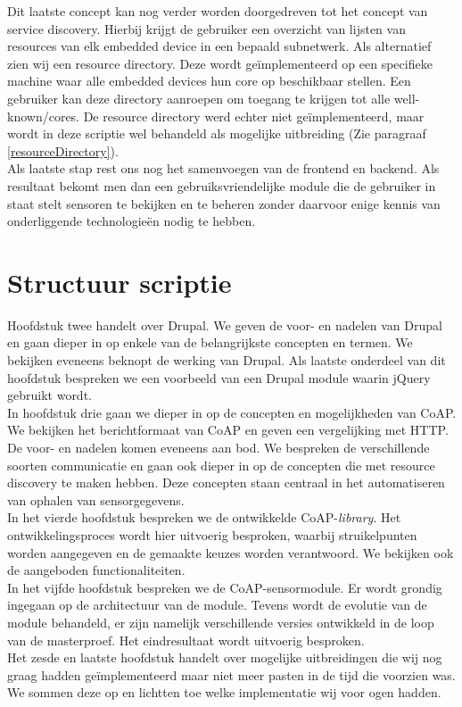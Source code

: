 Dit laatste concept kan nog verder worden doorgedreven tot het concept van service discovery. Hierbij krijgt de gebruiker een overzicht van lijsten van resources van elk embedded device in een bepaald subnetwerk. Als alternatief zien wij een resource directory. Deze wordt ge\"{i}mplementeerd op een specifieke machine waar alle embedded devices hun core op beschikbaar stellen. Een gebruiker kan deze directory aanroepen om toegang te krijgen tot alle well-known/cores. De resource directory werd echter niet ge\"{i}mplementeerd, maar wordt in deze scriptie wel behandeld als mogelijke uitbreiding (Zie paragraaf \ref{resourceDirectory}).\\
Als laatste stap rest ons nog het samenvoegen van de frontend en backend. Als resultaat bekomt men dan een gebruiksvriendelijke module die de gebruiker in staat stelt sensoren te bekijken en te beheren zonder daarvoor enige kennis van onderliggende technologie\"{e}n nodig te hebben.


\section{Structuur scriptie}

Hoofdstuk twee handelt over Drupal. We geven de voor- en nadelen van Drupal en gaan dieper in op enkele van de belangrijkste concepten en termen. We bekijken eveneens beknopt de werking van Drupal. Als laatste onderdeel van dit hoofdstuk bespreken we een voorbeeld van een Drupal module waarin jQuery gebruikt wordt.\\

In hoofdstuk drie gaan we dieper in op de concepten en mogelijkheden van CoAP. We bekijken het berichtformaat van CoAP en geven een vergelijking met HTTP. De voor- en nadelen komen eveneens aan bod. We bespreken de verschillende soorten communicatie en gaan ook dieper in op de concepten die met resource discovery te maken hebben. Deze concepten staan centraal in het automatiseren van ophalen van sensorgegevens.\\

In het vierde hoofdstuk bespreken we de ontwikkelde CoAP-\textit{library}. Het ontwikkelingsproces wordt hier uitvoerig besproken, waarbij struikelpunten worden aangegeven en de gemaakte keuzes worden verantwoord. We bekijken ook de aangeboden functionaliteiten.\\

In het vijfde hoofdstuk bespreken we de CoAP-sensormodule. Er wordt grondig ingegaan op de architectuur van de module. Tevens wordt de evolutie van de module behandeld, er zijn namelijk verschillende versies ontwikkeld in de loop van de masterproef. Het eindresultaat wordt uitvoerig besproken.\\

Het zesde en laatste hoofdstuk handelt over mogelijke uitbreidingen die wij nog graag hadden ge\"{i}mplementeerd maar niet meer pasten in de tijd die voorzien was. We sommen deze op en lichtten toe welke implementatie wij voor ogen hadden.










